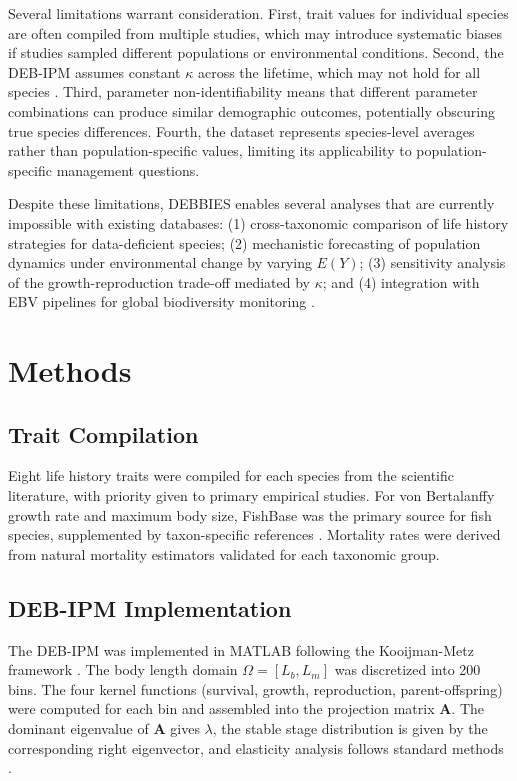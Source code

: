 \documentclass[11pt]{article}
\begin{document}
Several limitations warrant consideration. First, trait values for individual species are often compiled from multiple studies, which may introduce systematic biases if studies sampled different populations or environmental conditions. Second, the DEB-IPM assumes constant $\kappa$ across the lifetime, which may not hold for all species \citep{kooijman2000dynamic}. Third, parameter non-identifiability means that different parameter combinations can produce similar demographic outcomes, potentially obscuring true species differences. Fourth, the dataset represents species-level averages rather than population-specific values, limiting its applicability to population-specific management questions.

Despite these limitations, DEBBIES enables several analyses that are currently impossible with existing databases: (1) cross-taxonomic comparison of life history strategies for data-deficient species; (2) mechanistic forecasting of population dynamics under environmental change by varying $E(Y)$; (3) sensitivity analysis of the growth-reproduction trade-off mediated by $\kappa$; and (4) integration with EBV pipelines for global biodiversity monitoring \citep{pereira2017ebv, jetz2019essential}.

\section{Methods}

\subsection{Trait Compilation}

Eight life history traits were compiled for each species from the scientific literature, with priority given to primary empirical studies. For von Bertalanffy growth rate and maximum body size, FishBase \citep{froese2023fishbase} was the primary source for fish species, supplemented by taxon-specific references \citep{ebert2021sharks, last2016rays}. Mortality rates were derived from natural mortality estimators validated for each taxonomic group.

\subsection{DEB-IPM Implementation}

The DEB-IPM was implemented in MATLAB following the Kooijman-Metz framework \citep{kooijman1986energy, smallegange2017mechanistic}. The body length domain $\Omega = [L_b, L_m]$ was discretized into 200 bins. The four kernel functions (survival, growth, reproduction, parent-offspring) were computed for each bin and assembled into the projection matrix $\mathbf{A}$. The dominant eigenvalue of $\mathbf{A}$ gives $\lambda$, the stable stage distribution is given by the corresponding right eigenvector, and elasticity analysis follows standard methods \citep{caswell2001matrix}.
\end{document}
